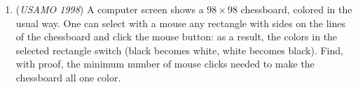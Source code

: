 \begin{enumerate}
\textbf{Solution}

Let $y_i = \tan{\left(a_i - \dfrac{\pi}{4}\right)}$, where $0 \leqslant i \leqslant n$. Then we have:

 
            \begin{itemize}
        \item $y_0 + y_1 + \cdots + y_n \geqslant n - 1$,
        \item $1 + y_i \geqslant \sum_{j \neq i}{(1 - y_j)}$,
        \item $\frac{1 + y_i}{n} \geqslant \frac{1}{n}\sum_{j \neq i}{(1 - y_j)}$.
            \end{itemize}
            By AM-GM:

 
 \begin{align*} \frac{1}{n}\sum_{j \neq i}{(1 - y_j)} &\geqslant \prod_{j \neq i}{(1 - y_j)^{\frac{1}{n}}} \\ \frac {1 + y_i}{n} &\geqslant \prod_{j \neq i}{(1 - y_j)^{\frac{1}{n}}} \\ \prod_{i = 0}^n\frac{1 + y_i}{n} &\geqslant \prod_{i = 0}^{n} {\prod_{j \neq i}{(1 - y_j)}^{\frac{1}{n}}} \\ \prod_{i = 0}^n\frac{1 + y_i}{n} &\geqslant \prod_{i = 0}^n{(1 - y_i)} \\ \prod_{i = 0}^n\frac{1 + y_i}{1 - y_i} &\geqslant \prod_{i = 0}^n{n} \\ \prod_{i = 0}^n\frac{1 + y_i}{1 - y_i} &\geqslant n^{n + 1}. \end{align*}


 Note that by the addition formula for tangents:

 
 \[\tan{(a_i)} = \tan{\left[\left(a_i - \frac{\pi}{4}\right) + \frac{\pi}{4}\right]} = \frac{1 + \tan{\left(a_i - \frac{\pi}{4}\right)}}{1 - \tan{\left(a_i - \frac{\pi}{4}\right)}} = \frac{1 + y_i}{1 - y_i}.\]

 So $\prod_{i = 0}^n{\frac{1 + y_i}{1 - y_i}} = \tan{(a_0)}\tan{(a_1)} \cdots \tan{(a_n)} \geqslant n^{n + 1}$, as desired. $\blacksquare$



	\item (\textit{USAMO 1998}) A computer screen shows a $98 \times 98$ chessboard, colored in the usual way. One can select with a mouse any rectangle with sides on the lines of the chessboard and click the mouse button: as a result,  the colors in the selected rectangle switch (black becomes white, white becomes black). Find, with proof, the minimum number of mouse clicks needed to make the chessboard all one color.



\end{enumerate}
